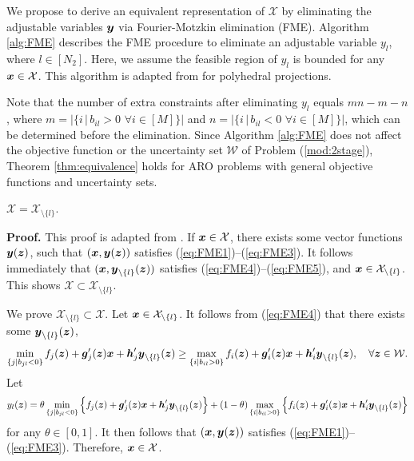 \documentclass[fleqn,mnsc,blindrev]{informs4}
\newcommand{\mb}[1]{\mbox{\boldmath \ensuremath{#1}}}
\begin{document}
	We propose to derive an equivalent representation of $\mathcal{X}$ by eliminating the adjustable variables $\mb{y}$  via Fourier-Motzkin elimination (FME). Algorithm \ref{alg:FME} describes the FME procedure to eliminate an adjustable variable $y_{l}$, where $l\in [N_2]$. Here, we assume the feasible region of $y_{l}$ is bounded for any $\mb{x} \in \mathcal{X}$. This algorithm is adapted from \cite[page 72]{bt97} for polyhedral projections. 

{Note that the number of extra constraints after eliminating $y_l$ equals $mn - m-n$, where $m = |\{ i \, | \, b_{il} > 0 \,\,  \forall i\in [M] \}|$ and  $n = |\{ i \, | \, b_{il} < 0  \,\, \forall i\in [M] \}|$, which can be determined before the elimination.  Since Algorithm \ref{alg:FME} does not affect the objective function or the uncertainty set $\mathcal{W}$ of Problem (\ref{mod:2stage}), Theorem \ref{thm:equivalence} holds for ARO problems with general objective functions and uncertainty sets.	}

	\begin{theorem} \label{thm:equivalence}
		$\mathcal{X} =\mathcal{X}_{\setminus \{l\}}$.
	\end{theorem}
	\textbf{Proof.}
	This proof is adapted from \cite[page 73]{bt97}. If $\mb{x} \in \mathcal{X}$, there exists some vector functions $\mb{y}(\mb{z})$, such that $(\mb{x}, \mb{y}(\mb{z}))$ satisfies  (\ref{eq:FME1})--(\ref{eq:FME3}). It follows immediately that $(\mb{x}, \mb{y}_{\setminus \{l\}}(\mb{z}))$ satisfies (\ref{eq:FME4})--(\ref{eq:FME5}), and $\mb{x} \in \mathcal{X}_{  \setminus \{l\}}$. This shows $\mathcal{X}  \subset \mathcal{X}_{ \setminus \{l\}}$.

	We prove $\mathcal{X}_{ \setminus\{l\}}  \subset \mathcal{X}$. Let $\mb{x} \in \mathcal{X}_{ \setminus\{l\}}$. It follows from (\ref{eq:FME4}) that there exists some $\mb{y}_{\setminus \{l\}}(\mb{z})$,
\begin{equation*}
	\min_{\{j | b_{jl} < 0 \}}  	f_j(\mb{z}) + \mb{g}'_j(\mb{z})\mb{x} + \mb{h}'_j \mb{y}_{\setminus \{l\}}(\mb{z})  \ge \max_{\{i | b_{il} > 0\}}  f_i(\mb{z}) + \mb{g}'_i(\mb{z})\mb{x} + \mb{h}'_i \mb{y}_{ \setminus \{l\}}(\mb{z}), \quad \forall \mb{z}\in \mathcal{W}.
\end{equation*}
	Let 
\begin{equation*}
	y_{l}(\mb{z}) = \theta \min_{\{j | b_{jl} < 0 \}} \left\{ 	f_j(\mb{z}) + \mb{g}'_j(\mb{z})\mb{x} + \mb{h}'_j \mb{y}_{\setminus \{l\}}(\mb{z})\right\} + (1-\theta) \max_{\{i | b_{il} > 0\}} \left\{f_i(\mb{z}) + \mb{g}'_i(\mb{z})\mb{x} + \mb{h}'_i \mb{y}_{ \setminus \{l\}}(\mb{z})\right\} 
\end{equation*}
	for any $\theta \in [0,1]$. It then follows that $(\mb{x}, \mb{y}(\mb{z}))$ satisfies  (\ref{eq:FME1})--(\ref{eq:FME3}). Therefore, $\mb{x} \in \mathcal{X}$.
	 \hfill \Halmos \\
	 
\end{document}
